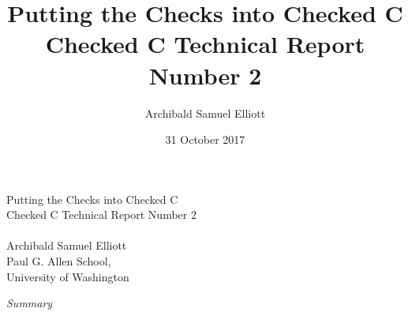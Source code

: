 \documentclass[10pt,openany,oneside]{book}
\title{Putting the Checks into Checked C \\%
Checked C Technical Report Number 2}
\author{Archibald Samuel Elliott}
\date{31 October 2017}
\begin{document}
\frontmatter
\begin{titlepage}
\begin{center}
\vspace*{2in}
{\huge Putting the Checks into Checked C \\}
\vspace{0.5in}
{Checked C Technical Report Number 2\medskip\\}
{\makeatletter\@date\makeatother\\}
\vspace{0.25in}
{\large Archibald Samuel Elliott\medskip\\}
{Paul G. Allen School,\\
University of Washington\\}
\vspace{1in}
{\it Summary \par}
\begin{minipage}{5in}

\end{minipage}
\end{center}
\end{titlepage}

\tableofcontents

\mainmatter









\appendix
{}


\theendnotes


\end{document}
